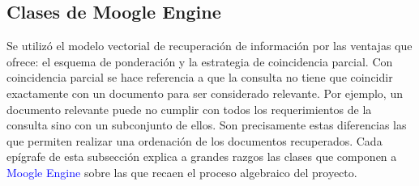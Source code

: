 \documentclass[a4paper, 12pt]{article}
\begin{document}
\subsection{Clases de Moogle Engine}\label{sub;engine}
 Se utilizó el modelo vectorial de recuperación de información por las ventajas que ofrece: el esquema de ponderación y la estrategia de coincidencia parcial. Con coincidencia parcial se hace referencia a que la consulta no tiene que coincidir exactamente con un documento para ser considerado relevante. Por ejemplo, un documento relevante puede no cumplir con todos los requerimientos de la consulta sino con un subconjunto de ellos. Son precisamente estas diferencias las que permiten realizar una ordenación de los documentos recuperados. 
 Cada epígrafe de esta subsección  explica a grandes razgos las clases que componen a \textcolor{blue}{Moogle Engine} sobre las que recaen el proceso algebraico del proyecto.
\end{document}
